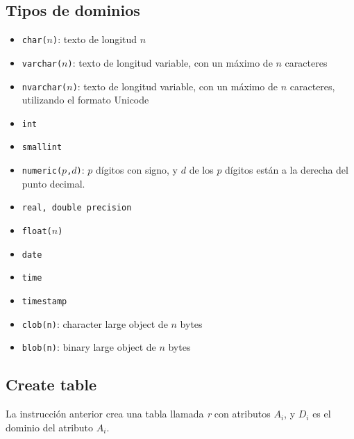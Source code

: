 \documentclass[a4paper, twoside]{article}
\newcommand{\codedir}{../resources/code} %
\begin{document}
\subsection{Tipos de dominios}
\begin{itemize}
	\item \texttt{char($n$)}: texto de longitud $n$
	\item \texttt{varchar($n$)}: texto de longitud variable, con un máximo de $n$ caracteres
	\item \texttt{nvarchar($n$)}: texto de longitud variable, con un máximo de $n$ caracteres, utilizando el formato Unicode
	\item \texttt{int}
	\item \texttt{smallint}
	\item \texttt{numeric($p$,$d$)}: $p$ dígitos con signo, y $d$ de los $p$ dígitos están a la derecha del punto decimal.
	\item \texttt{real, double precision}
	\item \texttt{float($n$)}
	\item \texttt{date}
	\item \texttt{time}
	\item \texttt{timestamp}
	\item \texttt{clob(n)}: character large object de $n$ bytes
	\item \texttt{blob(n)}: binary large object de $n$ bytes
\end{itemize}

\subsection{Create table}


La instrucción anterior crea una tabla llamada \emph{r} con atributos $A_{i}$, y $D_{i}$ es el dominio del atributo $A_{i}$.
\end{document}
